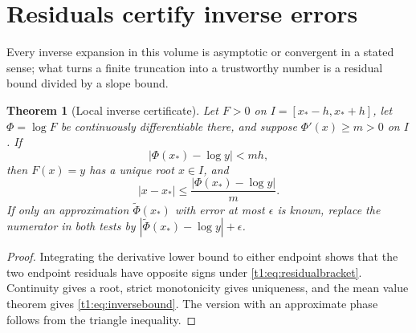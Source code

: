 \documentclass[11pt,openany]{book}
\numberwithin{equation}{chapter}
\theoremstyle{plain}
\newtheorem{theorem}{Theorem}[chapter]
\theoremstyle{definition}
\theoremstyle{remark}
\begin{document}
\section{Residuals certify inverse errors}
\label{ct:sec:residual}

Every inverse expansion in this volume is asymptotic or convergent in a
stated sense; what turns a finite truncation into a trustworthy number is a
residual bound divided by a slope bound.

\begin{theorem}[Local inverse certificate]
\label{t1:thm:certificate}
Let $F>0$ on $I=[x_*-h,x_*+h]$, let $\Phi=\log F$ be continuously differentiable there, and suppose $\Phi'(x)\ge m>0$ on $I$. If
\begin{equation}
 |\Phi(x_*)-\log y|<mh,
 \label{t1:eq:residualbracket}
\end{equation}
then $F(x)=y$ has a unique root $x\in I$, and
\begin{equation}
 |x-x_*|\le\frac{|\Phi(x_*)-\log y|}{m}.
 \label{t1:eq:inversebound}
\end{equation}
If only an approximation $\widetilde\Phi(x_*)$ with error at most $\epsilon$ is known, replace the numerator in both tests by
$|\widetilde\Phi(x_*)-\log y|+\epsilon$.
\end{theorem}
\begin{proof}
Integrating the derivative lower bound to either endpoint shows that the two endpoint residuals have opposite signs under \eqref{t1:eq:residualbracket}. Continuity gives a root, strict monotonicity gives uniqueness, and the mean value theorem gives \eqref{t1:eq:inversebound}. The version with an approximate phase follows from the triangle inequality.
\end{proof}
\end{document}
